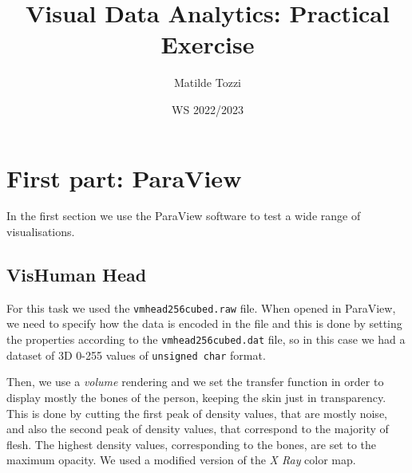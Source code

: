\documentclass[openany]{article}
\title{Visual Data Analytics: Practical Exercise}
\date{WS 2022/2023}
\author{Matilde Tozzi}
\begin{document}
\maketitle

\section {First part: ParaView}

In the first section we use the ParaView software to test a wide range of visualisations.

\subsection {VisHuman Head}

For this task we used the \texttt{vmhead256cubed.raw} file. When opened in ParaView, we need to specify how the data is encoded in the file and this is done by setting the properties according to the \texttt{vmhead256cubed.dat} file, so in this case we had a dataset of 3D 0-255 values of \texttt{unsigned char} format. 

Then, we use a \textit{volume} rendering and we set the transfer function in order to display mostly the bones of the person, keeping the skin just in transparency. This is done by cutting the first peak of density values, that are mostly noise, and also the second peak of density values, that correspond to the majority of flesh. The highest density values, corresponding to the bones, are set to the maximum opacity. We used a modified version of the \textit{X Ray} color map.
\end{document}
